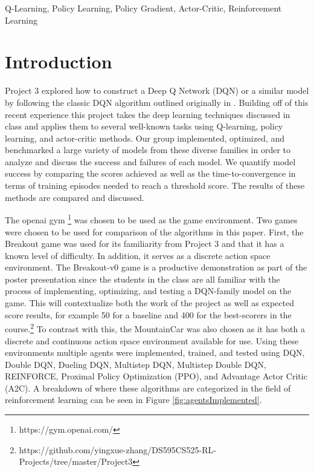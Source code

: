 \documentclass[conference]{IEEEtran}
\begin{document}
\begin{IEEEkeywords}
Q-Learning, Policy Learning, Policy Gradient, Actor-Critic, Reinforcement Learning
\end{IEEEkeywords}

\section{Introduction} \label{intro}
Project 3 explored how to construct a Deep Q Network (DQN) or a similar model by following the classic DQN algorithm outlined originally in \cite{DQNOriginalPaper}.
Building off of this recent experience this project takes the deep learning techniques discussed in class and applies them to several well-known tasks using Q-learning, policy learning, and actor-critic methods. Our group implemented, optimized, and benchmarked a large variety of models from these diverse families in order to analyze and discuss the success and failures of each model. We quantify model success by comparing the scores achieved as well as the time-to-convergence in terms of training episodes needed to reach a threshold score.
The results of these methods are compared and discussed.

The openai gym \footnote{https://gym.openai.com/} was chosen to be used as the game environment.
Two games were chosen to be used for comparison of the algorithms in this paper.
First, the Breakout game was used for its familiarity from Project 3 and that it has a known level of difficulty.
In addition, it serves as a discrete action space environment. The Breakout-v0 game is a productive demonstration as part of the poster presentation since the students in the class are all familiar with the process of implementing, optimizing, and testing a DQN-family model on the game. This will contextualize both the work of the project as well as expected score results, for example 50 for a baseline and 400 for the best-scorers in the course.\footnote{https://github.com/yingxue-zhang/DS595CS525-RL-Projects/tree/master/Project3}
To contrast with this, the MountainCar was also chosen as it has both a discrete and continuous action space environment available for use.
Using these environments multiple agents were implemented, trained, and tested using DQN, Double DQN, Dueling DQN, Multistep DQN, Multistep Double DQN, REINFORCE, Proximal Policy Optimization (PPO), and Advantage Actor Critic (A2C).
A breakdown of where these algorithms are categorized in the field of reinforcement learning can be seen in Figure \ref{fig:agentsImplemented}.
\end{document}
